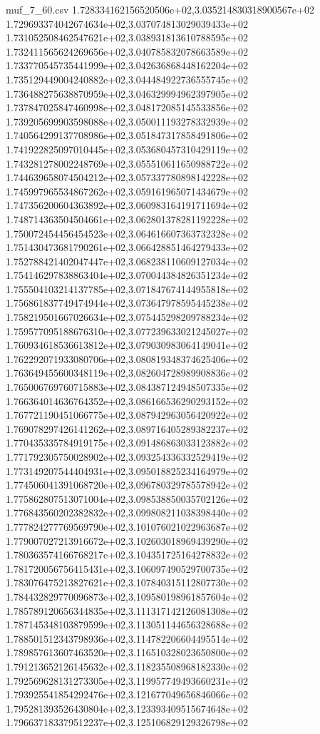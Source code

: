 \begin{filecontents*}{muf_7_60.csv}
1.728334162156520506e+02,3.035214830318900567e+02
1.729693374042674634e+02,3.037074813029039433e+02
1.731052508462547621e+02,3.038931813610788595e+02
1.732411565624269656e+02,3.040785832078663589e+02
1.733770545735441999e+02,3.042636868448162204e+02
1.735129449004240882e+02,3.044484922736555745e+02
1.736488275638870959e+02,3.046329994962397905e+02
1.737847025847460998e+02,3.048172085145533856e+02
1.739205699903598088e+02,3.050011193278332939e+02
1.740564299137708986e+02,3.051847317858491806e+02
1.741922825097010445e+02,3.053680457310429119e+02
1.743281278002248769e+02,3.055510611650988722e+02
1.744639658074504212e+02,3.057337780898142228e+02
1.745997965534867262e+02,3.059161965071434679e+02
1.747356200604363892e+02,3.060983164191711694e+02
1.748714363504504661e+02,3.062801378281192228e+02
1.750072454456454523e+02,3.064616607363732328e+02
1.751430473681790261e+02,3.066428851464279433e+02
1.752788421402047447e+02,3.068238110609127034e+02
1.754146297838863404e+02,3.070044384826351234e+02
1.755504103214137785e+02,3.071847674144955818e+02
1.756861837749474944e+02,3.073647978595445238e+02
1.758219501667026634e+02,3.075445298209788234e+02
1.759577095188676310e+02,3.077239633021245027e+02
1.760934618536613812e+02,3.079030983064149041e+02
1.762292071933080706e+02,3.080819348374625406e+02
1.763649455600348119e+02,3.082604728989908836e+02
1.765006769760715883e+02,3.084387124948507335e+02
1.766364014636764352e+02,3.086166536290293152e+02
1.767721190451066775e+02,3.087942963056420922e+02
1.769078297426141262e+02,3.089716405289382237e+02
1.770435335784919175e+02,3.091486863033123882e+02
1.771792305750028902e+02,3.093254336332529419e+02
1.773149207544404931e+02,3.095018825234164979e+02
1.774506041391068720e+02,3.096780329785578942e+02
1.775862807513071004e+02,3.098538850035702126e+02
1.776843560202382832e+02,3.099808211038398440e+02
1.777824277769569790e+02,3.101076021022963687e+02
1.779007027213916672e+02,3.102603018969439290e+02
1.780363574166768217e+02,3.104351725164278832e+02
1.781720056756415431e+02,3.106097490529700735e+02
1.783076475213827621e+02,3.107840315112807730e+02
1.784432829770096873e+02,3.109580198961857604e+02
1.785789120656344835e+02,3.111317142126081308e+02
1.787145348103879599e+02,3.113051144656328688e+02
1.788501512343798936e+02,3.114782206604495514e+02
1.789857613607463520e+02,3.116510328023650800e+02
1.791213652126145632e+02,3.118235508968182330e+02
1.792569628131273305e+02,3.119957749493660231e+02
1.793925541854292476e+02,3.121677049656846066e+02
1.795281393526430804e+02,3.123393409515674648e+02
1.796637183379512237e+02,3.125106829129326798e+02

\end{filecontents*}
